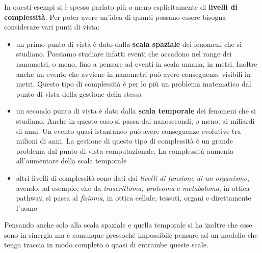 \documentclass[a4paper,12pt, oneside]{book}
\begin{document}
In questi esempi si è spesso parlato più o meno esplicitamente di
\textbf{livelli di complessità}. Per poter avere un'idea di quanti possano
essere bisogna considerare vari punti di vista:
\begin{itemize}
  \item un primo punto di vista è dato dalla \textbf{scala spaziale} dei
  fenomeni che si studiano. Possiamo studiare infatti eventi che accadono nel
  range dei nanometri, o meno, fino a pensare ad eventi in scala umana, in
  metri. Inoltre 
  anche un evento che avviene in nanometri può avere conseguenze visibili in
  metri. Questo tipo di complessità è per lo più un problema matematico dal
  punto di vista della gestione della stessa
  \item un secondo punto di vista è dato dalla \textbf{scala temporale} dei
  fenomeni che si studiano. Anche in questo caso si passa dai nanosecondi, o
  meno, ai miliardi di anni. Un evento quasi istantaneo può avere conseguenze
  evolutive tra milioni di anni. La gestione di questo tipo di complessità è un
  grande problema dal punto di vista computazionale. La complessità aumenta
  all'aumentare della scala temporale
  \item altri livelli di complessità sono dati dai \textit{livelli di funzione
    di un organismo}, avendo, ad esempio, che da \textit{trascrittoma, proteoma}
  e \textit{metaboloma}, in ottica pathway, si passa al \textit{fisioma}, in
  ottica cellule, tessuti, organi e direttamente l'uomo
\end{itemize}
Pensando anche solo alla scala spaziale e quella temporale si ha inoltre che
esse sono in sinergia ma è comunque pressoché impossibile pensare ad un modello
che tenga traccia in modo completo o quasi di entrambe queste scale.
\end{document}
